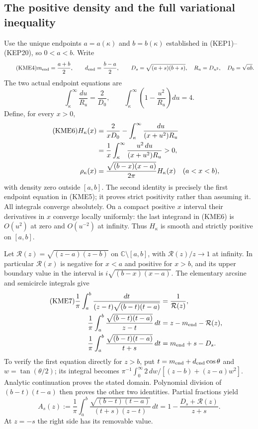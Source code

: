 \documentclass[11pt,a4paper]{article}
\begin{document}


\subsection{The positive density and the full variational inequality}
Use the unique endpoints $a=a(\kappa)$ and $b=b(\kappa)$ established in
(KEP1)--(KEP20), so $0<a<b$. Write
\begin{equation}\tag{KME4}
 m_{\rm end}=\frac{a+b}{2},\qquad d_{\rm end}=\frac{b-a}{2},\qquad
 D_s=\sqrt{(a+s)(b+s)},\quad R_u=D_{u^2},\quad D_0=\sqrt{ab}.
\end{equation}
The two actual endpoint equations are
\begin{equation}\tag{KME5}
 \int_\kappa^\infty\frac{du}{R_u}=\frac2{D_0},\qquad
 \int_\kappa^\infty\left(1-\frac{u^2}{R_u}\right)du=4.
\end{equation}
Define, for every $x>0$,
\begin{align}\tag{KME6}
 H_\kappa(x)
 &=\frac2{xD_0}-\int_\kappa^\infty\frac{du}{(x+u^2)R_u}\\
 &=\frac1x\int_\kappa^\infty
                  \frac{u^2\,du}{(x+u^2)R_u}>0,\notag\\
 \rho_\kappa(x)&=\frac{\sqrt{(b-x)(x-a)}}{2\pi}H_\kappa(x)
                  \quad(a<x<b),\notag
\end{align}
with density zero outside $[a,b]$.  The second identity is precisely the
first endpoint equation in (KME5); it proves strict positivity rather
than assuming it. All integrals converge absolutely. On a compact
positive $x$ interval their derivatives in $x$ converge locally uniformly:
the last integrand in (KME6) is $O(u^2)$ at zero and $O(u^{-2})$
at infinity. Thus $H_\kappa$ is smooth and strictly positive on $[a,b]$.

Let $\mathcal R(z)=\sqrt{(z-a)(z-b)}$ on
$\mathbb C\setminus[a,b]$, with $\mathcal R(z)/z\to1$ at infinity.
In particular $\mathcal R(x)$ is negative for $x<a$ and positive for
$x>b$, and its upper boundary value in the interval is
$i\sqrt{(b-x)(x-a)}$.
The elementary arcsine and semicircle integrals give
\begin{align}\tag{KME7}
 \frac1\pi\int_a^b
    \frac{dt}{(z-t)\sqrt{(b-t)(t-a)}}&=\frac1{\mathcal R(z)},\\
 \frac1\pi\int_a^b
    \frac{\sqrt{(b-t)(t-a)}}{z-t}\,dt&=z-m_{\rm end}-\mathcal R(z),\notag\\
 \frac1\pi\int_a^b
    \frac{\sqrt{(b-t)(t-a)}}{t+s}\,dt&=m_{\rm end}+s-D_s.\notag
\end{align}
To verify the first equation directly for $z>b$, put
$t=m_{\rm end}+d_{\rm end}\cos\theta$ and $w=\tan(\theta/2)$; its integral becomes
$\pi^{-1}\int_0^\infty2\,dw/[(z-b)+(z-a)w^2]$.
Analytic continuation proves the stated domain. Polynomial division
of $(b-t)(t-a)$ then proves the other two identities.
Partial fractions yield
\begin{equation}\tag{KME8}
 A_s(z):=\frac1\pi\int_a^b
  \frac{\sqrt{(b-t)(t-a)}}{(t+s)(z-t)}\,dt
   =1-\frac{D_s+\mathcal R(z)}{z+s}.
\end{equation}
At $z=-s$ the right side has its removable value.
\end{document}
